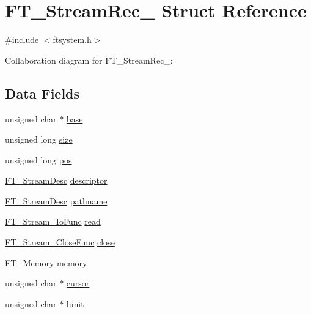 \hypertarget{struct_f_t___stream_rec__}{}\section{F\+T\+\_\+\+Stream\+Rec\+\_\+ Struct Reference}
\label{struct_f_t___stream_rec__}


{\ttfamily \#include $<$ftsystem.\+h$>$}



Collaboration diagram for F\+T\+\_\+\+Stream\+Rec\+\_\+\+:
\subsection*{Data Fields}
\begin{DoxyCompactItemize}
\item 
unsigned char $\ast$ \hyperlink{struct_f_t___stream_rec___a7b406cb9a60c5a8b4bd8d04b7a23cfee}{base}
\item 
unsigned long \hyperlink{struct_f_t___stream_rec___ab00e3cf802c950d0ca5a022a06953123}{size}
\item 
unsigned long \hyperlink{struct_f_t___stream_rec___a5bf82c2ff4554752edfeec442fba2f33}{pos}
\item 
\hyperlink{ftsystem_8h_ad7ddff377e42bfb38bec17f11fa75911}{F\+T\+\_\+\+Stream\+Desc} \hyperlink{struct_f_t___stream_rec___a361c44020eace21cc453b51852d8cc4f}{descriptor}
\item 
\hyperlink{ftsystem_8h_ad7ddff377e42bfb38bec17f11fa75911}{F\+T\+\_\+\+Stream\+Desc} \hyperlink{struct_f_t___stream_rec___afd75c5de5ed78c484a200a7e97ef5a41}{pathname}
\item 
\hyperlink{ftsystem_8h_a1909d9c00ba62592c047a9868e5a6b0b}{F\+T\+\_\+\+Stream\+\_\+\+Io\+Func} \hyperlink{struct_f_t___stream_rec___af724049d0258d4988c2b11c3a08b1b05}{read}
\item 
\hyperlink{ftsystem_8h_a9ab6151513724c69e5493d520d43135f}{F\+T\+\_\+\+Stream\+\_\+\+Close\+Func} \hyperlink{struct_f_t___stream_rec___a7d7c7a1d7de8f580d7ad66efe89defa9}{close}
\item 
\hyperlink{ftsystem_8h_a67ec7ea35cde99a89a65e9f827a9ad3a}{F\+T\+\_\+\+Memory} \hyperlink{struct_f_t___stream_rec___a51e2be0d80d70b532aae3face5461e7e}{memory}
\item 
unsigned char $\ast$ \hyperlink{struct_f_t___stream_rec___ab7dbbad87d8b6d0178771a06e1ce8b4d}{cursor}
\item 
unsigned char $\ast$ \hyperlink{struct_f_t___stream_rec___aff006e6ee3bbc2741a2c4ae79b1bad3a}{limit}
\end{DoxyCompactItemize}


